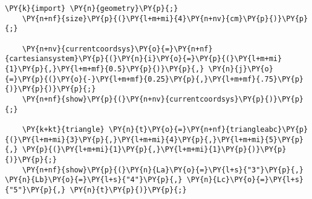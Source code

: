 \begin{Verbatim}[commandchars=\\\{\}]
    \PY{k}{import} \PY{n}{geometry}\PY{p}{;}
    \PY{n+nf}{size}\PY{p}{(}\PY{l+m+mi}{4}\PY{n+nv}{cm}\PY{p}{)}\PY{p}{;}

    \PY{n+nv}{currentcoordsys}\PY{o}{=}\PY{n+nf}{cartesiansystem}\PY{p}{(}\PY{n}{i}\PY{o}{=}\PY{p}{(}\PY{l+m+mi}{1}\PY{p}{,}\PY{l+m+mf}{0.5}\PY{p}{)}\PY{p}{,} \PY{n}{j}\PY{o}{=}\PY{p}{(}\PY{o}{-}\PY{l+m+mf}{0.25}\PY{p}{,}\PY{l+m+mf}{.75}\PY{p}{)}\PY{p}{)}\PY{p}{;}
    \PY{n+nf}{show}\PY{p}{(}\PY{n+nv}{currentcoordsys}\PY{p}{)}\PY{p}{;}

    \PY{k+kt}{triangle} \PY{n}{t}\PY{o}{=}\PY{n+nf}{triangleabc}\PY{p}{(}\PY{l+m+mi}{3}\PY{p}{,}\PY{l+m+mi}{4}\PY{p}{,}\PY{l+m+mi}{5}\PY{p}{,} \PY{p}{(}\PY{l+m+mi}{1}\PY{p}{,}\PY{l+m+mi}{1}\PY{p}{)}\PY{p}{)}\PY{p}{;}
    \PY{n+nf}{show}\PY{p}{(}\PY{n}{La}\PY{o}{=}\PY{l+s}{"3"}\PY{p}{,} \PY{n}{Lb}\PY{o}{=}\PY{l+s}{"4"}\PY{p}{,} \PY{n}{Lc}\PY{o}{=}\PY{l+s}{"5"}\PY{p}{,} \PY{n}{t}\PY{p}{)}\PY{p}{;}
\end{Verbatim}
